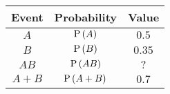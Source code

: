 \begin{tabular}{|c|c|c|} 
\hline
\textbf{Event} & \textbf{Probability} & \textbf{Value} \\
\hline
$A$ & $\text{P}\left(A\right)$ & $0.5$ \\
\hline
$B$ & $\text{P}\left(B\right)$ & $0.35$ \\
\hline
$AB$ & $\text{P}\left(AB\right)$ & $?$ \\
\hline
$A + B$ & $\text{P}\left(A + B\right)$ & $0.7$ \\
\hline
\end{tabular}